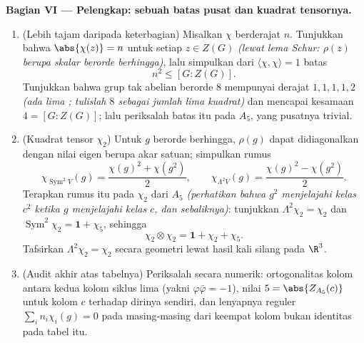 \begin{problem}
\medskip
\noindent\textbf{Bagian VI --- Pelengkap: sebuah batas pusat dan
kuadrat tensornya.}
\begin{enumerate}[resume]
  \item (Lebih tajam daripada keterbagian) Misalkan $\chi$ 
        berderajat $n$. Tunjukkan bahwa $\abs{\chi(z)} = n$ untuk setiap
        $z \in Z(G)$ \emph{(lewat lema Schur: $\rho(z)$ berupa
        skalar berorde berhingga)}, lalu simpulkan dari
        $\langle\chi, \chi\rangle = 1$ batas
        \[
        n^2 \leq [G : Z(G)] .
        \]
        Tunjukkan bahwa grup tak abelian berorde $8$ mempunyai
        derajat  $1, 1, 1, 1, 2$ \emph{(ada lima
        ; tulislah $8$ sebagai jumlah lima kuadrat)}
        dan mencapai kesamaan $4 = [G : Z(G)]$; lalu periksalah batas itu
        pada $A_5$, yang pusatnya trivial.
  \item (Kuadrat tensor $\chi_2$) Untuk $g$ berorde berhingga,
        $\rho(g)$ dapat didiagonalkan dengan nilai eigen berupa akar satuan;
        simpulkan rumus 
        \[
        \chi_{\operatorname{Sym}^2 V}(g)
        = \frac{\chi(g)^2 + \chi(g^2)}2,
        \qquad
        \chi_{\Lambda^2 V}(g)
        = \frac{\chi(g)^2 - \chi(g^2)}2 .
        \]
        Terapkan rumus itu pada $\chi_2$ dari $A_5$ \emph{(perhatikan bahwa $g^2$ menjelajahi
        kelas $c^2$ ketika $g$ menjelajahi kelas
        $c$, dan sebaliknya)}: tunjukkan $\Lambda^2\chi_2 =
        \chi_2$ dan $\operatorname{Sym}^2\chi_2 = \mathbf 1 +
        \chi_5$, sehingga
        \[
        \chi_2\otimes\chi_2 = \mathbf 1 + \chi_2 + \chi_5 .
        \]
        Tafsirkan $\Lambda^2\chi_2 = \chi_2$ secara geometri lewat
        hasil kali silang pada $\R^3$.
  \item (Audit akhir atas tabelnya) Periksalah secara numerik: ortogonalitas
        kolom antara kedua kolom siklus lima
        (yakni $\varphi\bar\varphi = -1$), nilai $5 =
        \abs{Z_{A_5}(c)}$ untuk kolom $c$ terhadap dirinya sendiri,
        dan lenyapnya  reguler $\sum_i
        n_i\chi_i(g) = 0$ pada masing-masing dari keempat kolom
        bukan identitas pada tabel itu.

\end{enumerate}
\end{problem}

